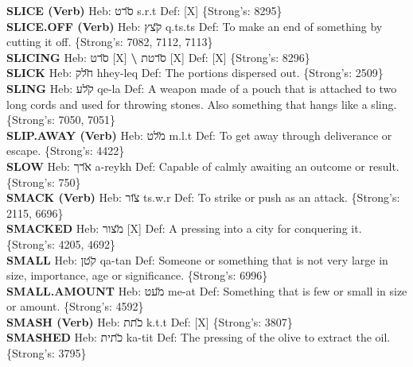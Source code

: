 {\textbf{SLICE (Verb)} Heb: {\large\H סרט} s.r.t Def: {[}X{]} \{Strong's: 8295\}\hfill{}\\

\textbf{SLICE.OFF (Verb)} Heb: {\large\H קצץ} q.ts.ts Def: To make an end of something by cutting it off. \{Strong's: 7082, 7112, 7113\}\hfill{}\\

\textbf{SLICING} Heb: {\large\H סרט} {[}X{]} \textbf{\textbackslash{}} {\large\H סרטת} {[}X{]} Def: {[}X{]} \{Strong's: 8296\}\hfill{}\\

\textbf{SLICK} Heb: {\large\H חלק} hhey-leq Def: The portions dispersed out. \{Strong's: 2509\}\hfill{}\\

\textbf{SLING} Heb: {\large\H קלע} qe-la Def: A weapon made of a pouch that is attached to two long cords and used for throwing stones. Also something that hangs like a sling. \{Strong's: 7050, 7051\}\hfill{}\\

\textbf{SLIP.AWAY (Verb)} Heb: {\large\H מלט} m.l.t Def: To get away through deliverance or escape. \{Strong's: 4422\}\hfill{}\\

\textbf{SLOW} Heb: {\large\H ארך} a-reykh Def: Capable of calmly awaiting an outcome or result. \{Strong's: 750\}\hfill{}\\

\textbf{SMACK (Verb)} Heb: {\large\H צור} ts.w.r Def: To strike or push as an attack. \{Strong's: 2115, 6696\}\hfill{}\\

\textbf{SMACKED} Heb: {\large\H מצור} {[}X{]} Def: A pressing into a city for conquering it. \{Strong's: 4205, 4692\}\hfill{}\\

\textbf{SMALL} Heb: {\large\H קטן} qa-tan Def: Someone or something that is not very large in size, importance, age or significance. \{Strong's: 6996\}\hfill{}\\

\textbf{SMALL.AMOUNT} Heb: {\large\H מעט} me-at Def: Something that is few or small in size or amount. \{Strong's: 4592\}\hfill{}\\

\textbf{SMASH (Verb)} Heb: {\large\H כתת} k.t.t Def: {[}X{]} \{Strong's: 3807\}\hfill{}\\

\textbf{SMASHED} Heb: {\large\H כתית} ka-tit Def: The pressing of the olive to extract the oil. \{Strong's: 3795\}\hfill{}\\

}
